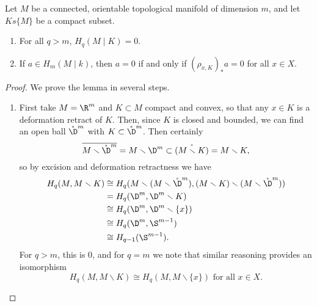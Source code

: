 \documentclass[main.tex]{subfiles}
\begin{document}
\begin{lemma}
  \label{lemma:manifold_induction_for_compacta}
  Let \(M\) be a connected, orientable topological manifold of dimension \(m\), and let \(K s\{ M\}\) be a compact subset.
  \begin{enumerate}
    \item For all \(q > m\), \(H_{q}(M \mid K) = 0\).

    \item If \(a \in H_{m}(M \mid k)\), then \(a = 0\) if and only if \((\rho_{x, K})_{*}a = 0\) for all \(x \in X\).
  \end{enumerate}
\end{lemma}
\begin{proof}
  We prove the lemma in several steps.
  \begin{enumerate}
    \item First take \(M = \R^{m}\) and \(K \subset M\) compact and convex, so that any \(x \in K\) is a deformation retract of \(K\). Then, since \(K\) is closed and bounded, we can find an open ball \(\mathring{\D}^{m}\) with \(K \subset \mathring{\D}^{m}\). Then certainly
      \begin{equation*}
        \overline{M \smallsetminus \mathring{\D}^{m}} = M \smallsetminus \D^{m} \subset \mathring{(M \smallsetminus K)} = M \smallsetminus K,
      \end{equation*}
      so by excision and deformation retractness we have
      \begin{align*}
        H_{q}(M, M \smallsetminus K) &\cong H_{q}(M \smallsetminus (M \smallsetminus \mathring{\D}^{m}), (M \smallsetminus K) \smallsetminus (M \smallsetminus \mathring{\D}^{m})) \\
        &= H_{q}(\D^{m}, \D^{m} \smallsetminus K) \\
        &\cong H_{q}(\D^{m}, \D^{m} \smallsetminus \{x\}) \\
        &\cong H_{q}(\D^{m}, \S^{m-1}) \\
        &\cong H_{q-1}(\S^{m-1}).
      \end{align*}
      For \(q > m\), this is \(0\), and for \(q = m\) we note that similar reasoning provides an isomorphism
      \begin{equation*}
        H_{q}(M, M \smallsetminus K) \cong H_{q}(M, M \smallsetminus \{x\})\text{ for all } x \in X.
      \end{equation*}


\end{enumerate}
\end{proof}
\end{document}
